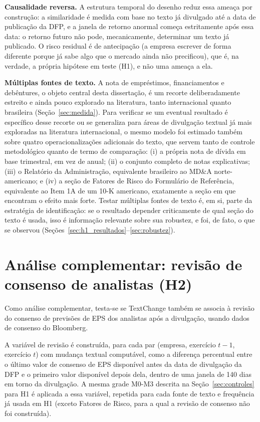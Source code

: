 \documentclass[a4paper,12pt]{report}
\begin{document}
\textbf{Causalidade reversa.} A estrutura temporal do desenho reduz essa ameaça por construção: a similaridade é medida com base no texto já divulgado até a data de publicação da DFP, e a janela de retorno anormal começa estritamente após essa data: o retorno futuro não pode, mecanicamente, determinar um texto já publicado. O risco residual é de antecipação (a empresa escrever de forma diferente porque já sabe algo que o mercado ainda não precificou), que é, na verdade, a própria hipótese em teste (H1), e não uma ameaça a ela.

\textbf{Múltiplas fontes de texto.} A nota de empréstimos, financiamentos e debêntures, o objeto central desta dissertação, é um recorte deliberadamente estreito e ainda pouco explorado na literatura, tanto internacional quanto brasileira (Seção~\ref{sec:medida}). Para verificar se um eventual resultado é específico desse recorte ou se generaliza para áreas de divulgação textual já mais exploradas na literatura internacional, o mesmo modelo foi estimado também sobre quatro operacionalizações adicionais do texto, que servem tanto de controle metodológico quanto de termo de comparação: (i) a própria nota de dívida em base trimestral, em vez de anual; (ii) o conjunto completo de notas explicativas; (iii) o Relatório da Administração, equivalente brasileiro ao MD\&A norte-americano; e (iv) a seção de Fatores de Risco do Formulário de Referência, equivalente ao Item 1A de um 10-K americano, exatamente a seção em que  encontram o efeito mais forte. Testar múltiplas fontes de texto é, em si, parte da estratégia de identificação: se o resultado depender criticamente de qual seção do texto é usada, isso é informação relevante sobre sua robustez, e foi, de fato, o que se observou (Seções~\ref{sec:h1_resultados}--\ref{sec:robustez}).

\section{Análise complementar: revisão de consenso de analistas (H2)}
\label{sec:h2_metodologia}

Como análise complementar, testa-se se TextChange também se associa à revisão do consenso de previsões de EPS dos analistas após a divulgação, usando dados de consenso do Bloomberg.

A variável de revisão é construída, para cada par (empresa, exercício $t-1$, exercício $t$) com mudança textual computável, como a diferença percentual entre o último valor de consenso de EPS disponível antes da data de divulgação da DFP e o primeiro valor disponível depois dela, dentro de uma janela de 140 dias em torno da divulgação. A mesma grade M0-M3 descrita na Seção~\ref{sec:controles} para H1 é aplicada a essa variável, repetida para cada fonte de texto e frequência já usada em H1 (exceto Fatores de Risco, para a qual a revisão de consenso não foi construída).
\end{document}
